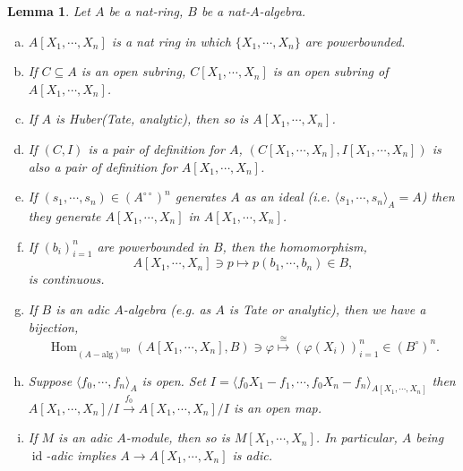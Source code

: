 \documentclass[8pt]{article}
\numberwithin{equation}{section}
\newtheorem{lemma}{Lemma}[subsection]
\DeclareMathOperator{\Hom}{Hom}
\DeclareMathOperator{\id}{id}
\newcommand{\dcirc}[0]{{\circ\circ}}
\begin{document}
\begin{lemma}
    \label{lemma_19_1}
    Let $A$ be a nat-ring, $B$ be a nat-$A$-algebra.
    \begin{enumerate}[a.]
        \item $A[X_1,\cdots,X_n]$ is a nat ring in which $\{X_1,\cdots,X_n\}$ are powerbounded.
        \item If $C\subseteq A$ is an open subring, $C[X_1,\cdots,X_n]$ is an open subring of $A[X_1,\cdots,X_n]$.
        \item If $A$ is Huber(Tate, analytic), then so is $A[X_1,\cdots,X_n]$. 
        \item If $(C,I)$ is a pair of definition for $A$, $(C[X_1,\cdots,X_n],I[X_1,\cdots,X_n])$ is also a pair of definition for $A[X_1,\cdots,X_n]$.
        \item If $(s_1,\cdots,s_n)\in (A^{\dcirc})^n$ generates $A$ as an ideal (i.e. $\langle s_1,\cdots,s_n\rangle_A =A$) then they generate $A[X_1,\cdots,X_n]$ in $A[X_1,\cdots,X_n]$.
        \item If $(b_i)_{i=1}^n$ are powerbounded in $B$, then the homomorphism,
        \begin{equation*}
            A[X_1,\cdots,X_n]\ni p\mapsto p(b_1,\cdots,b_n)\in B,
        \end{equation*}
        is continuous. 
        \item If $B$ is an adic $A$-algebra (e.g. as $A$ is Tate or analytic), then we have a bijection,
        \begin{equation*}
            \Hom_{(A-\mathrm{alg})^{\mathrm{top}}}(A[X_1,\cdots,X_n],B)\ni\varphi\stackrel{\cong}{\mapsto}(\varphi(X_i))_{i=1}^n\in(B^\circ)^n.
        \end{equation*}
        \item Suppose $\langle f_0,\cdots,f_n\rangle_A$ is open. Set $I=\langle f_0X_1-f_1,\cdots,f_0X_n-f_n\rangle_{A[X_1,\cdots,X_n]}$ then $A[X_1,\cdots,X_n]/I\stackrel{f_0}{\to}A[X_1,\cdots,X_n]/I$ is an open map.
        \item If $M$ is an adic $A$-module, then so is $M[X_1,\cdots,X_n]$. In particular, $A$ being $\id$-adic implies $A\to A[X_1,\cdots,X_n]$ is adic.
    \end{enumerate}
\end{lemma}
\end{document}

